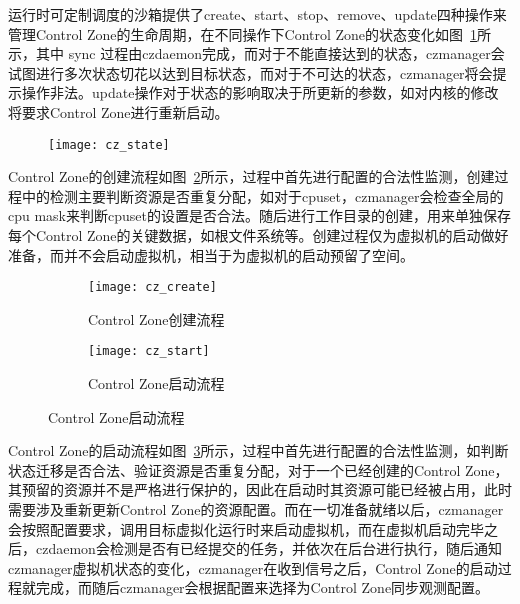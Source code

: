 运行时可定制调度的沙箱提供了create、start、stop、remove、update四种操作来管理Control Zone的生命周期，在不同操作下Control Zone的状态变化如图~\ref{fig:cz_state}所示，其中 sync 过程由czdaemon完成，而对于不能直接达到的状态，czmanager会试图进行多次状态切花以达到目标状态，而对于不可达的状态，czmanager将会提示操作非法。update操作对于状态的影响取决于所更新的参数，如对内核的修改将要求Control Zone进行重新启动。

\begin{figure}[!htbp]
    \centering
    \texttt{[image: cz\_state]}
    \label{fig:cz_state}
\end{figure}

Control Zone的创建流程如图~\ref{fig:cz_create}所示，过程中首先进行配置的合法性监测，创建过程中的检测主要判断资源是否重复分配，如对于cpuset，czmanager会检查全局的cpu mask来判断cpuset的设置是否合法。随后进行工作目录的创建，用来单独保存每个Control Zone的关键数据，如根文件系统等。创建过程仅为虚拟机的启动做好准备，而并不会启动虚拟机，相当于为虚拟机的启动预留了空间。

\begin{figure}[H]
    \centering
    \begin{subfigure}[b]{0.43\textwidth}
        \texttt{[image: cz\_create]}
        \caption{\quad Control Zone创建流程}
        \label{fig:cz_create}
    \end{subfigure}
    \begin{subfigure}[b]{0.56\textwidth}
        \texttt{[image: cz\_start]}
        \caption{\quad Control Zone启动流程}
        \label{fig:cz_start}
    \end{subfigure}
\label{fig:cz_create_start}
\end{figure}

Control Zone的启动流程如图~\ref{fig:cz_start}所示，过程中首先进行配置的合法性监测，如判断状态迁移是否合法、验证资源是否重复分配，对于一个已经创建的Control Zone，其预留的资源并不是严格进行保护的，因此在启动时其资源可能已经被占用，此时需要涉及重新更新Control Zone的资源配置。而在一切准备就绪以后，czmanager会按照配置要求，调用目标虚拟化运行时来启动虚拟机，而在虚拟机启动完毕之后，czdaemon会检测是否有已经提交的任务，并依次在后台进行执行，随后通知czmanager虚拟机状态的变化，czmanager在收到信号之后，Control Zone的启动过程就完成，而随后czmanager会根据配置来选择为Control Zone同步观测配置。

